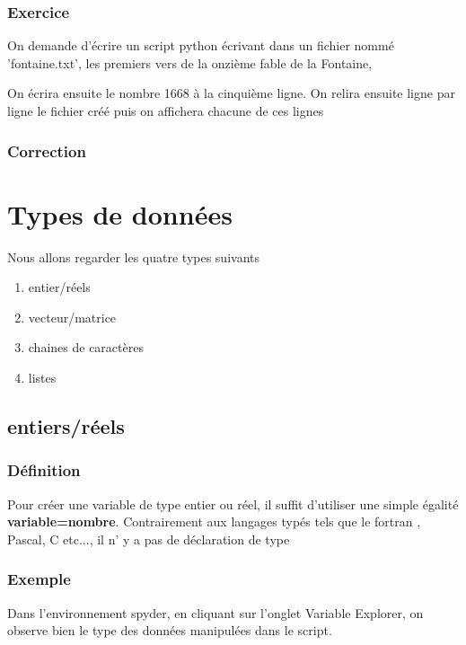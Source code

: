 \documentclass[a4paper,12pt]{article}
\begin{document}
\subsubsection{Exercice}
\begin{leftbar}
On demande d'\'ecrire un script python \'ecrivant dans un fichier nomm\'e 'fontaine.txt', les premiers vers de la onzi\`eme fable de la Fontaine, 

On \'ecrira ensuite le nombre 1668 \`a la cinqui\`eme ligne.
On relira ensuite ligne par ligne le fichier cr\'e\'e puis on affichera chacune de ces lignes
\end{leftbar}
\subsubsection{Correction}


\clearpage
\section{Types de donn\'ees}
Nous allons regarder les quatre types suivants
\begin{enumerate}
\item entier/r\'eels
\item vecteur/matrice
\item chaines de caractères
\item listes
\end{enumerate}

\subsection{entiers/réels}

\subsubsection{Définition}
Pour créer une variable de type entier ou réel, il suffit d'utiliser une simple égalité \textbf{variable=nombre}.
Contrairement aux langages typés tels que le fortran , Pascal, C etc..., il n' y a pas de déclaration de type

\subsubsection{Exemple}


Dans l'environnement spyder, en cliquant sur l'onglet Variable Explorer, on observe bien le type des données manipulées dans le script.
\end{document}
